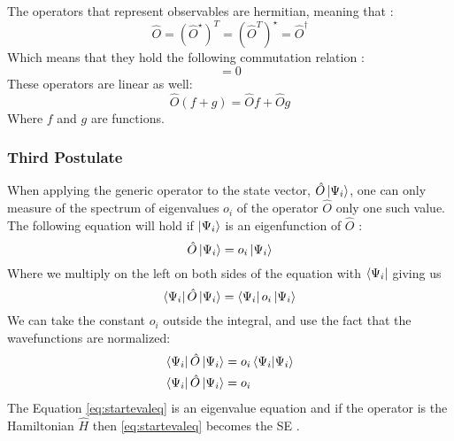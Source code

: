 \documentclass[../master_thesis.tex]{subfiles}
\begin{document}
The operators that represent observables are hermitian, meaning that
\cite{Cohen:1973}:
\begin{equation}
  \hat{O} = (\hat{O}^{\star})^T = (\hat{O}^T)^{\star} = \hat{O}^{\dagger}
\end{equation}
Which means that they hold the following commutation relation
\cite{Cohen:1973}:
\begin{equation}
  [\hat{O}, \hat{O}^{\dagger}] = 0
\end{equation}
These operators are linear as well:
\begin{equation}
    \hat{O}(f + g) = \hat{O}f + \hat{O}g\label{eq:oplinearity}
\end{equation}
Where $f$ and $g$ are functions.

\subsubsection{Third Postulate}
When applying the generic operator to the state vector, $\hat{O}\ket{\Psi_i}$,
one can only measure of the spectrum of eigenvalues $o_i$ of the operator $\hat{O}$
only one such value. The following equation will hold if $\ket{\Psi_i}$ is an
eigenfunction of $\hat{O}$
\cite{Cohen:1973, Atkins:2014}:
\begin{equation}
  \hat{O}\ket{\Psi_i} = o_i\ket{\Psi_i}\label{eq:startevaleq}
\end{equation}
Where we multiply on the left on both sides of the equation with $\bra{\Psi_i}$
giving us
\begin{equation}
  \bra{\Psi_i}\hat{O}\ket{\Psi_i} = \bra{\Psi_i}o_i\ket{\Psi_i}
\end{equation}
We can take the constant $o_i$ outside the integral, and
use the fact that the wavefunctions are normalized:
\begin{align}
  \begin{split}
    \bra{\Psi_i}\hat{O}\ket{\Psi_i} &= o_i\braket{\Psi_i|\Psi_i}\\
    \bra{\Psi_i}\hat{O}\ket{\Psi_i} &= o_i \label{eq:endevaleq}
  \end{split}
\end{align}
The Equation \ref{eq:startevaleq} is an eigenvalue equation and if the operator is
the Hamiltonian $\hat{H}$ then \ref{eq:startevaleq} becomes the \ac{SE} \cite{Cramer:2004}.
\end{document}
